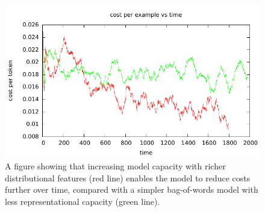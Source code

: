 \begin{figure}[t]
  \begin{centering}
  \includegraphics[width=1.0\textwidth]{figures/sentiment_cost_per_token_vs_time/cost_per_token_vs_time.pdf}
  \end{centering}
  \caption{A figure showing that increasing model capacity with richer distributional features (red line) enables the model to reduce costs further over time, compared with a simpler bag-of-words model with less representational capacity (green line).}
\label{fig:sentiment-tradeoff}
\end{figure}
